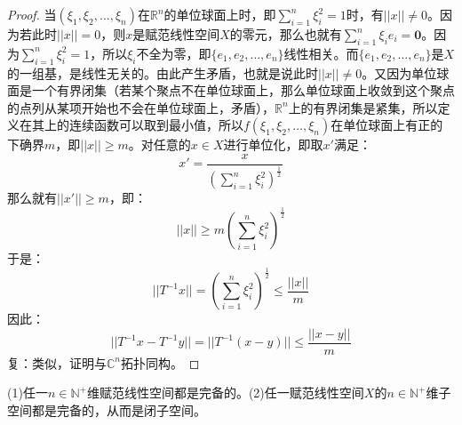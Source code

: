 \begin{proof}
	当$(\xi_1,\xi_2,\dots,\xi_n)$在$\mathbb{R}^n$的单位球面上时，即$\sum\limits_{i=1}^n\xi_i^2=1$时，有$||x||\ne0$。因为若此时$||x||=0$，则$x$是赋范线性空间$X$的零元，那么也就有$\sum\limits_{i=1}^n\xi_ie_i=\mathbf{0}$。因为$\sum\limits_{i=1}^n\xi_i^2=1$，所以$\xi_i$不全为零，即$\{e_1,e_2,\dots,e_n\}$线性相关。而$\{e_1,e_2,\dots,e_n\}$是$X$的一组基，是线性无关的。由此产生矛盾，也就是说此时$||x||\ne0$。又因为单位球面是一个有界闭集（若某个聚点不在单位球面上，那么单位球面上收敛到这个聚点的点列从某项开始也不会在单位球面上，矛盾），$\mathbb{R}^{n}$上的有界闭集是紧集，所以定义在其上的连续函数可以取到最小值，所以$f(\xi_1,\xi_2,\dots,\xi_n)$在单位球面上有正的下确界$m$，即$||x||\geqslant m$。对任意的$x\in X$进行单位化，即取$x'$满足：
	\begin{equation*}
		x'=\frac{x}{\left(\sum\limits_{i=1}^n\xi_i^2\right)^\frac{1}{2}}
	\end{equation*}
	那么就有$||x'||\geqslant m$，即：
	\begin{equation*}
		||x||\geqslant m\left(\sum\limits_{i=1}^n\xi_i^2\right)^\frac{1}{2}
	\end{equation*}
	于是：
	\begin{equation*}
		||T^{-1}x||=\left(\sum\limits_{i=1}^n\xi_i^2\right)^\frac{1}{2}\leqslant\frac{||x||}{m}
	\end{equation*}
	因此：
	\begin{equation*}
		||T^{-1}x-T^{-1}y||=||T^{-1}(x-y)||\leqslant\frac{||x-y||}{m}
	\end{equation*}
	复：类似，证明与$\mathbb{C}^n$拓扑同构。
\end{proof}
\begin{corollary}
	(1)任一$n\in\mathbb{N}^+$维赋范线性空间都是完备的。(2)任一赋范线性空间$X$的$n\in\mathbb{N}^+$维子空间都是完备的，从而是闭子空间。
\end{corollary}
